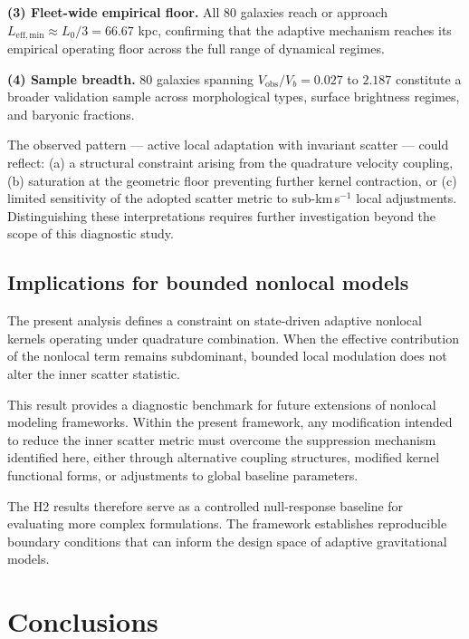 \documentclass{aa}
\newcommand{\Vobs}{V_{\mathrm{obs}}}
\begin{document}
	\textbf{(3) Fleet-wide empirical floor.} All 80 galaxies reach or
	approach $L_{\mathrm{eff,min}} \approx L_0/3 = 66.67$ kpc, confirming that
	the adaptive mechanism reaches its empirical operating floor across the
	full range of dynamical regimes.

	\textbf{(4) Sample breadth.} 80 galaxies spanning
	$\Vobs/V_b = 0.027$ to $2.187$ constitute a broader validation sample
	across morphological types, surface brightness regimes, and baryonic
	fractions.

	The observed pattern --- active local adaptation with invariant scatter
	--- could reflect: (a) a structural constraint arising from the
	quadrature velocity coupling, (b) saturation at the geometric floor
	preventing further kernel contraction, or (c) limited sensitivity of
	the adopted scatter metric to sub-km\,s$^{-1}$ local adjustments.
	Distinguishing these interpretations requires further investigation
	beyond the scope of this diagnostic study.

	\subsection{Implications for bounded nonlocal models}
	
	The present analysis defines a constraint on state-driven adaptive nonlocal 
	kernels operating under quadrature combination. When the effective
	contribution of the nonlocal term remains subdominant, bounded local
	modulation does not alter the inner scatter statistic.
	
	This result provides a diagnostic benchmark for future extensions of nonlocal
	modeling frameworks. Within the present framework, any modification intended to reduce the
	inner scatter metric must overcome the suppression mechanism identified here, either
	through alternative coupling structures, modified kernel functional forms,
	or adjustments to global baseline parameters.
	
	The H2 results therefore serve as a controlled null-response baseline for 
	evaluating more complex formulations. The framework establishes reproducible 
	boundary conditions that can inform the design space of adaptive gravitational 
	models.
\section{Conclusions}
\end{document}

